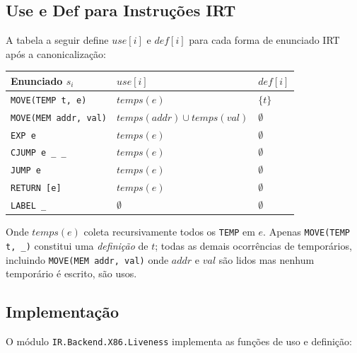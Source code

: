 \subsection{Use e Def para Instruções IRT}

A tabela a seguir define $\mathit{use}[i]$ e $\mathit{def}[i]$ para
cada forma de enunciado IRT após a canonicalização:

\begin{center}
  \begin{tabular}{lll}
    \toprule
    Enunciado $s_i$ & $\mathit{use}[i]$ & $\mathit{def}[i]$ \\
    \midrule
    \texttt{MOVE(TEMP t, e)}      & $\mathit{temps}(e)$
    & $\{t\}$   \\
    \texttt{MOVE(MEM addr, val)}  & $\mathit{temps}(\mathit{addr})
    \cup \mathit{temps}(\mathit{val})$ & $\emptyset$ \\
    \texttt{EXP e}                & $\mathit{temps}(e)$
    & $\emptyset$ \\
    \texttt{CJUMP e \_ \_}       & $\mathit{temps}(e)$
    & $\emptyset$ \\
    \texttt{JUMP e}               & $\mathit{temps}(e)$
    & $\emptyset$ \\
    \texttt{RETURN [e]}           & $\mathit{temps}(e)$
    & $\emptyset$ \\
    \texttt{LABEL \_}             & $\emptyset$
    & $\emptyset$ \\
    \bottomrule
  \end{tabular}
\end{center}

Onde $\mathit{temps}(e)$ coleta recursivamente todos os \texttt{TEMP}
em $e$. Apenas \texttt{MOVE(TEMP t, \_)} constitui uma \emph{definição}
de $t$; todas as demais ocorrências de temporários, incluindo
\texttt{MOVE(MEM addr, val)} onde $addr$ e $val$ são lidos mas nenhum
temporário é escrito, são usos.

\subsection{Implementação}

O módulo \texttt{IR.Backend.X86.Liveness} implementa as funções de
uso e definição:

